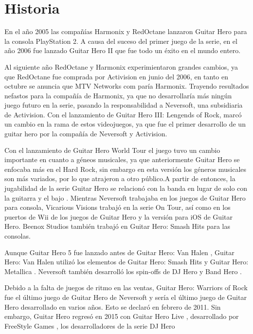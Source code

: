 \documentclass[12pt]{article}
\begin{document}
\section{Historia}
    En el año 2005 las compañías Harmonix y RedOctane lanzaron Guitar Hero para la consola PlayStation 2. A causa del suceso del primer juego de la serie, en el año 2006 fue lanzado Guitar Hero II que fue todo un éxito en el mundo entero. 
    
Al siguiente año RedOctane y Harmonix experimientaron grandes cambios, ya que RedOctane fue comprada por Activision en junio del 2006, en tanto en octubre se anuncia que MTV Networks com paría Harmonix. Trayendo resultados nefastos para la compañía de Harmonix, ya que  no desarrollaría más ningún juego futuro en la serie, pasando la responsabilidad a Neversoft, una subsidiaria de Activision.
Con el lanzamiento de Guitar Hero III: Lengends of Rock, marcó un cambio en la rama de estos videojuegos, ya que fue el primer desarrollo de un guitar hero por la compañía de Neversoft y Activision. 

Con el lanzamiento de Guitar Hero World Tour el juego tuvo un cambio importante en cuanto a géneos musicales, ya que anteriormente Guitar Hero se enfocaba más en el Hard Rock, sin embargo en esta versión los géneros musicales son más variados, por lo que atrajeron a otro público.A partir de entonces, la jugabilidad de la serie Guitar Hero se relacionó con la banda en lugar de solo con la guitarra y el bajo .
Mientras Neversoft trabajaba en los juegos de Guitar Hero para consola, Vicarious Visions trabajó en la serie On Tour, así como en los puertos de Wii de los juegos de Guitar Hero y la versión para iOS de Guitar Hero. Beenox Studios   también trabajó en Guitar Hero: Smash Hits para las consolas.

Aunque Guitar Hero 5 fue lanzado antes de Guitar Hero: Van Halen , Guitar Hero: Van Halen utilizó los elementos de Guitar Hero: Smash Hits y Guitar Hero: Metallica . Neversoft también desarrolló los spin-offs de DJ Hero y Band Hero .

Debido a la falta de juegos de ritmo en las ventas, Guitar Hero: Warriors of Rock fue el último juego de Guitar Hero de Neversoft y sería el último juego de Guitar Hero desarrollado en varios años. Esto se declaró en febrero de 2011.
Sin embargo, Guitar Hero regresó en 2015 con Guitar Hero Live , desarrollado por FreeStyle Games , los desarrolladores de la serie DJ Hero
\newpage
\end{document}
